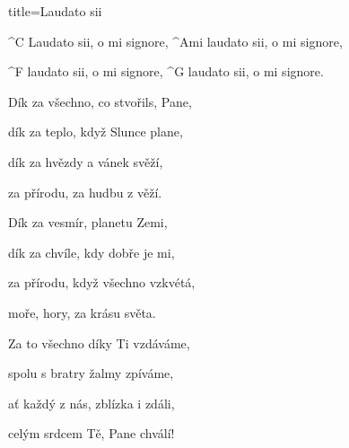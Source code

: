 \begin{song}{title=\predtitle\centering Laudato sii \\\large \phantom{\,} \vspace*{-0.3cm}}  %
\begin{centerjustified}
\nejnejvetsi

	^{C \z}Laudato sii, o mi signore, ^{Ami \z}laudato sii, o mi signore,
	
	^{F \z}laudato sii, o mi signore, ^{G \z}laudato sii, o mi signore.

\sloka
	Dík za všechno, co stvořils, Pane,

	dík za teplo, když Slunce plane,

	dík za hvězdy a vánek svěží,

	za přírodu, za hudbu z věží.


\sloka
	Dík za vesmír, planetu Zemi,
	
	dík za chvíle, kdy dobře je mi,

	za přírodu, když všechno vzkvétá,

	moře, hory, za krásu světa.


\sloka
	Za to všechno díky Ti vzdáváme,

	spolu s bratry žalmy zpíváme,

	ať každý z nás, zblízka i zdáli,

	celým srdcem Tě, Pane chválí!



\end{centerjustified}
\setcounter{Slokočet}{0}
\end{song}
